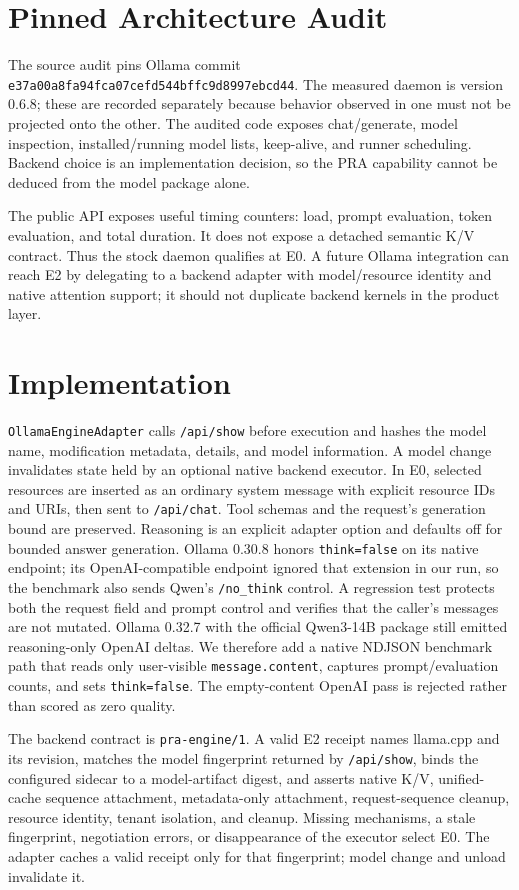 \documentclass[10pt]{article}
\begin{document}
\section{Pinned Architecture Audit}
The source audit pins Ollama commit
\texttt{e37a00a8fa94fca07cefd544bffc9d8997ebcd44}. The measured daemon is version
0.6.8; these are recorded separately because behavior observed in one must not
be projected onto the other. The audited code exposes chat/generate, model
inspection, installed/running model lists, keep-alive, and runner scheduling.
Backend choice is an implementation decision, so the PRA capability cannot be
deduced from the model package alone.

The public API exposes useful timing counters: load, prompt evaluation, token
evaluation, and total duration. It does not expose a detached semantic K/V
contract. Thus the stock daemon qualifies at E0. A future Ollama integration can
reach E2 by delegating to a backend adapter with model/resource identity and
native attention support; it should not duplicate backend kernels in the
product layer.

\section{Implementation}
\texttt{OllamaEngineAdapter} calls \texttt{/api/show} before execution and hashes
the model name, modification metadata, details, and model information. A model
change invalidates state held by an optional native backend executor. In E0,
selected resources are inserted as an ordinary system message with explicit
resource IDs and URIs, then sent to \texttt{/api/chat}. Tool schemas and the
request's generation bound are preserved. Reasoning is an explicit adapter
option and defaults off for bounded answer generation. Ollama 0.30.8 honors
\texttt{think=false} on its native endpoint; its OpenAI-compatible endpoint
ignored that extension in our run, so the benchmark also sends Qwen's
\texttt{/no\_think} control. A regression test protects both the request field
and prompt control and verifies that the caller's messages are not mutated.
Ollama 0.32.7 with the official Qwen3-14B package still emitted reasoning-only
OpenAI deltas. We therefore add a native NDJSON benchmark path that reads only
user-visible \texttt{message.content}, captures prompt/evaluation counts, and
sets \texttt{think=false}. The empty-content OpenAI pass is rejected rather
than scored as zero quality.

The backend contract is \texttt{pra-engine/1}. A valid E2 receipt names
llama.cpp and its revision, matches the model fingerprint returned by
\texttt{/api/show}, binds the configured sidecar to a model-artifact digest,
and asserts native K/V, unified-cache sequence attachment,
metadata-only attachment, request-sequence cleanup, resource identity, tenant
isolation, and cleanup. Missing mechanisms, a stale fingerprint, negotiation
errors, or disappearance of the executor select E0. The adapter caches a valid
receipt only for that fingerprint; model change and unload invalidate it.
\end{document}
